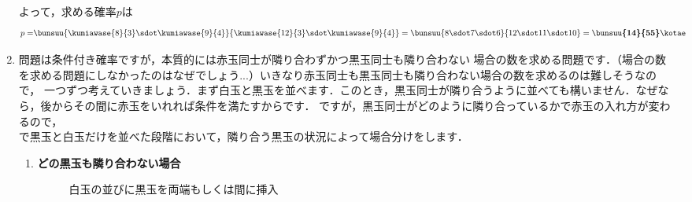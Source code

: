 \documentclass[../../../doc/main]{subfiles}
\begin{document}
\begin{enumerate}
            よって，求める確率$p$は
            \begin{align*}
            p=&\bunsuu{\kumiawase{8}{3}\sdot\kumiawase{9}{4}}{\kumiawase{12}{3}\sdot\kumiawase{9}{4}}=\bunsuu{8\sdot7\sdot6}{12\sdot11\sdot10}=\boldsymbol{\bunsuu{14}{55}}\kotae
            \end{align*}
        \item [\kakkoni]
            \textcolor{myBlue2}{問題は条件付き確率ですが，本質的には赤玉同士が隣り合わずかつ黒玉同士も隣り合わない
            場合の数を求める問題です．（場合の数を求める問題にしなかったのはなぜでしょう...）いきなり赤玉同士も黒玉同士も隣り合わない場合の数を求めるのは難しそうなので，
            一つずつ考えていきましょう．まず白玉と黒玉を並べます．このとき，黒玉同士が隣り合うように並べても構いません．なぜなら，後からその間に赤玉をいれれば条件を満たすからです．
            ですが，黒玉同士がどのように隣り合っているかで赤玉の入れ方が変わるので，} \\
            \kakkoichi で黒玉と白玉だけを並べた段階において，隣り合う黒玉の状況によって場合分けをします．
            \begin{enumerate}
                \item [\tokeiichi]
                    {\bf どの黒玉も隣り合わない場合} 

                    \begin{figure}[htbp]
                        \centering
                        \caption{白玉の並びに黒玉を両端もしくは間に挿入}
                        \label{白玉の並びに黒玉を両端もしくは間に挿入}
                    \end{figure}


\end{enumerate}
\end{enumerate}
\end{document}
